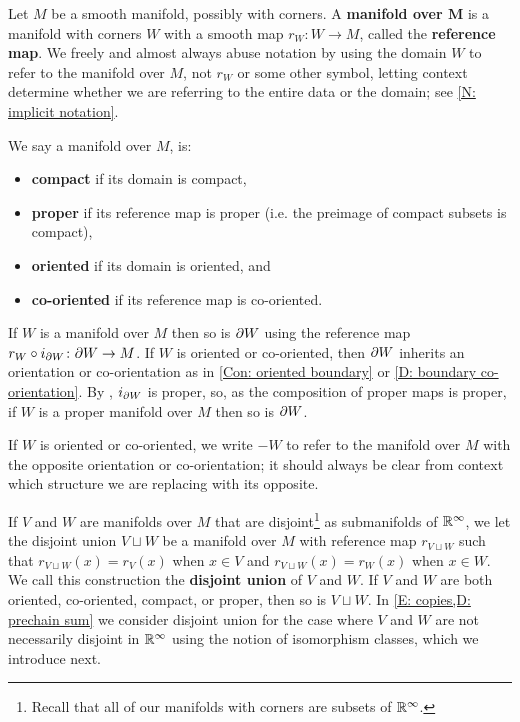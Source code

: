 \begin{definition}\label{V: maps are co-oriented}
	Let $M$ be a smooth manifold, possibly with corners.
	A \textbf{manifold over $\mathbf{M}$} is a manifold with corners $W$ with a smooth map $r_W \colon W \to M$,
	called the \textbf{reference map}.
	We freely and almost always abuse notation
	by using the domain $W$ to refer to the manifold over $M$, not $r_W$ or some other symbol, letting
	context determine whether we are referring to the entire data or the domain; see \cref{N: implicit notation}.

	We say a manifold over $M$, is:
	\begin{itemize}
		\item \textbf{compact} if its domain is compact,
		\item \textbf{proper} if its reference map is proper (i.e. the preimage of compact subsets is compact),
		\item \textbf{oriented} if its domain is oriented, and
		\item \textbf{co-oriented} if its reference map is co-oriented.
	\end{itemize}
	If $W$ is a manifold over $M$ then so is $\partial W$ using the reference map $r_W \circ i_{\partial W} \colon \partial W \to M$.
	If $W$ is oriented or co-oriented, then $\partial W$ inherits an orientation or co-orientation as in \cref{Con: oriented boundary} or \cref{D: boundary co-orientation}.
	By \cite[Lemma 2.8]{Joy12}, $i_{\partial W}$ is proper, so, as the composition of proper maps is proper, if $W$ is a proper manifold over $M$ then so is $\partial W$.

	If $W$ is oriented or co-oriented, we write $-W$ to refer to the manifold over $M$ with the opposite orientation or co-orientation; it should always be clear from context which structure we are replacing with its opposite.

	If $V$ and $W$ are manifolds over $M$ that are disjoint\footnote{Recall that all of our manifolds with corners are subsets of $\mathbb{R}^\infty$.} as submanifolds of $\mathbb{R}^\infty$, we let the disjoint union $V \sqcup W$ be a manifold over $M$ with reference map $r_{V \sqcup W}$ such that $r_{V \sqcup W}(x) = r_V(x)$ when $x \in V$ and $r_{V \sqcup W}(x) = r_W(x)$ when $x \in W$.
	We call this construction the \textbf{disjoint union} of $V$ and $W$.
	If $V$ and $W$ are both oriented, co-oriented, compact, or proper, then so is $V \sqcup W$.
	In \cref{E: copies,D: prechain sum} we consider disjoint union for the case where $V$ and $W$ are not necessarily disjoint in $\mathbb{R}^\infty$ using the notion of isomorphism classes, which we introduce next.
\end{definition}

